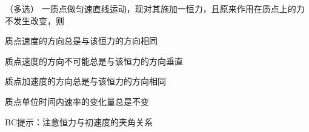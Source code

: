 （多选）
一质点做匀速直线运动，现对其施加一恒力，且原来作用在质点上的力不发生改变，则\paren[]
\begin{choices}
	\item 质点速度的方向总是与该恒力的方向相同
	\item 质点速度的方向不可能总是与该恒力的方向垂直
	\item 质点加速度的方向总是与该恒力的方向相同
	\item 质点单位时间内速率的变化量总是不变
\end{choices}
\begin{answer}
	BC\qquad 提示：注意恒力与初速度的夹角关系
\end{answer}